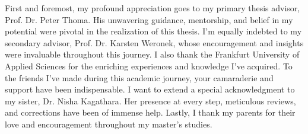 \documentclass[
11pt, %
oneside, %
english, %
onehalfspacing, %
headsepline, %
]{MastersDoctoralThesis} %
\begin{document}
\begin{acknowledgements}
\addchaptertocentry{\acknowledgementname} %
\vspace{3mm}
First and foremost, my profound appreciation goes to my primary thesis advisor, Prof. Dr. Peter Thoma. His unwavering guidance, mentorship, and belief in my potential were pivotal in the realization of this thesis. I'm equally indebted to my secondary advisor, Prof. Dr. Karsten Weronek, whose encouragement and insights were invaluable throughout this journey. I also thank the Frankfurt University of Applied Sciences for the enriching experiences and knowledge I've acquired. To the friends I've made during this academic journey, your camaraderie and support have been indispensable.
I want to extend a special acknowledgment to my sister, Dr. Nisha Kagathara. Her presence at every step, meticulous reviews, and corrections have been of immense help.
Lastly, I thank my parents for their love and encouragement throughout my master's studies.
\end{acknowledgements}


\tableofcontents %

\listoffigures %

\listofalgorithms %

\listoftables %

\lstlistoflistings %

\end{document}
